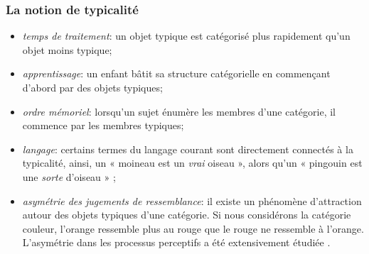 \subsubsection{La notion de typicalité}
\label{sec:ch3_typicité}




\begin{itemize}
\item \emph{temps de traitement}: un objet typique est catégorisé plus rapidement qu'un objet moins typique;
\item \emph{apprentissage}: un enfant bâtit sa structure catégorielle en commençant d'abord par des objets typiques;
\item \emph{ordre mémoriel}: lorsqu'un sujet énumère les membres d'une catégorie, il commence par les membres typiques;
\item \emph{langage}: certains termes du langage courant sont directement connectés à la typicalité, ainsi, un « moineau est un \emph{vrai} oiseau », alors qu'un « pingouin est une \emph{sorte} d'oiseau » \citep{mervis1981categorization};
\item \emph{asymétrie des jugements de ressemblance}: il existe un phénomène d'attraction autour des objets typiques d'une catégorie. Si nous considérons la catégorie couleur, l’orange ressemble plus au rouge que le rouge ne ressemble à l'orange. L'asymétrie dans les processus perceptifs a été extensivement étudiée \citep{tversky1977features,krumhansl1978concerning}.
\end{itemize}


